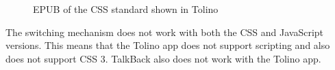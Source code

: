 \begin{figure}[h]
	\centering
	\caption{EPUB of the CSS standard shown in Tolino}
	\label{fig:tolino}
\end{figure}

The switching mechanism does not work with both the CSS and JavaScript versions. This means that the Tolino app does not support scripting and also does  not support CSS 3. TalkBack also does not work with the Tolino app.

